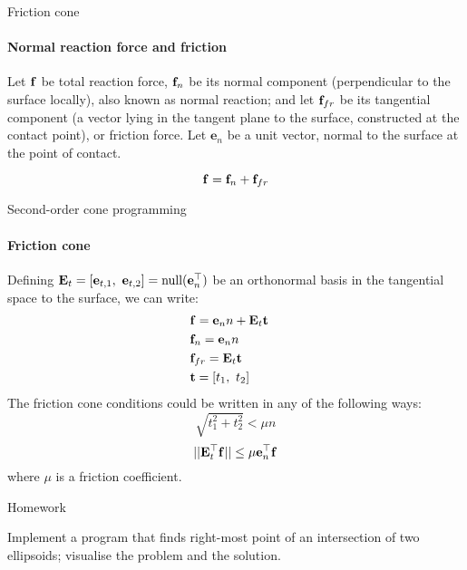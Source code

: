 \documentclass{beamer}
\begin{document}
\begin{frame}{Friction cone}
\framesubtitle{Normal reaction force and friction}
\begin{flushleft}

\begin{figure}
    \centering
    
    \label{fig:contact}
\end{figure}

Let $\mathbf{f}$ be total reaction force, $\mathbf{f}_n$ be its normal component (perpendicular to the surface locally), also known as normal reaction; and let $\mathbf{f}_{fr}$ be its tangential component (a vector lying in the tangent plane to the surface, constructed at the contact point), or friction force. Let $\mathbf{e}_n$ be a unit vector, normal to the surface at the point of contact.

\begin{equation}
    \mathbf{f} =  \mathbf{f}_n + \mathbf{f}_{fr}
\end{equation}

\end{flushleft}
\end{frame}



\begin{frame}{Second-order cone programming}
\framesubtitle{Friction cone}
\begin{flushleft}

Defining $\bo{E}_t = [\mathbf{e}_{t, 1}, \ \mathbf{e}_{t, 2}] = \text{null}(\mathbf{e}_n\T)$ be an orthonormal basis in the tangential space to the surface, we can write:
%
\begin{align*}
\label{friction_cone}
    & \mathbf{f} = \mathbf{e}_n n + \mathbf{E}_t \mathbf{t} & \\
    & \mathbf{f}_n = \mathbf{e}_n n & \\
    & \mathbf{f}_{fr} = \mathbf{E}_t \mathbf{t} & \\
    & \mathbf{t} = [t_1, \ t_2]
\end{align*}
%
The friction cone conditions could be written in any of the following ways:
%
\begin{equation}
\label{friction_cone}
    \sqrt{t_1^2 + t_2^2} < \mu n
\end{equation}
%
\begin{equation}
    || \mathbf{E}_t^\top \mathbf{f} || \leq \mu \mathbf{e}_n^\top \mathbf{f}
\end{equation}
%
where $\mu$ is a friction coefficient.
 
\end{flushleft}
\end{frame}



\begin{frame}{Homework}
\begin{flushleft}

Implement a program that finds right-most point of an intersection of two ellipsoids; visualise the problem and the solution.

\end{flushleft}
\end{frame}





\myqrframe
\end{document}

